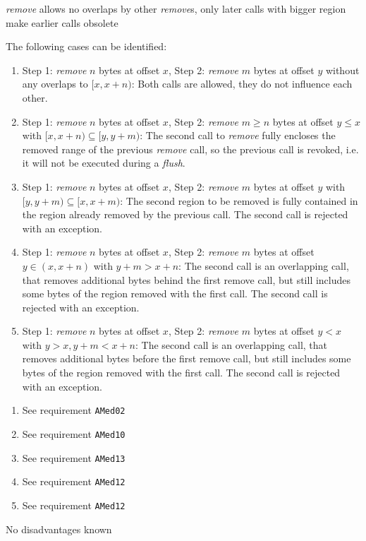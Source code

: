 {%
\emph{remove} allows no overlaps by other \emph{remove}s, only later calls with bigger region make earlier calls obsolete
}
{%
The following cases can be identified:
\begin{enumerate}
\item Step 1: \emph{remove} $n$ bytes at offset $x$, Step 2: \emph{remove} $m$ bytes at offset $y$ without any overlaps to $[x,x+n)$: Both calls are allowed, they do not influence each other.
\item Step 1: \emph{remove} $n$ bytes at offset $x$, Step 2: \emph{remove} $m\geq n$ bytes at offset $y\leq x$ with $[x,x+n)\subseteq [y,y+m)$: The second call to \emph{remove} fully encloses the removed range of the previous \emph{remove} call, so the previous call is revoked, i.e. it will not be executed during a \emph{flush}.
\item Step 1: \emph{remove} $n$ bytes at offset $x$, Step 2: \emph{remove} $m$ bytes at offset $y$ with $[y,y+m)\subseteq [x,x+m)$: The second region to be removed is fully contained in the region already removed by the previous call. The second call is rejected with an exception.
\item Step 1: \emph{remove} $n$ bytes at offset $x$, Step 2: \emph{remove} $m$ bytes at offset $y\in (x,x+n)$ with $y+m>x+n$: The second call is an overlapping call, that removes additional bytes behind the first remove call, but still includes some bytes of the region removed with the first call. The second call is rejected with an exception.
\item Step 1: \emph{remove} $n$ bytes at offset $x$, Step 2: \emph{remove} $m$ bytes at offset $y<x$ with $y>x, y+m<x+n$: The second call is an overlapping call, that removes additional bytes before the first remove call, but still includes some bytes of the region removed with the first call. The second call is rejected with an exception.
\end{enumerate}
}
{%
\begin{enumerate}
\item See requirement \texttt{AMed02}
\item See requirement \texttt{AMed10}
\item See requirement \texttt{AMed13}
\item See requirement \texttt{AMed12}
\item See requirement \texttt{AMed12}
\end{enumerate}
}
{%
No disadvantages known
}

